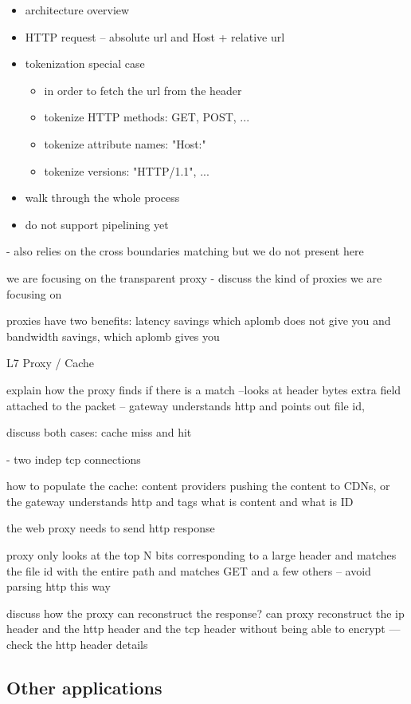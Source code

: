 \begin{itemize}
\item architecture overview
\item HTTP request -- absolute url and Host + relative url
\item tokenization special case \\
    \begin{itemize}
    \item in order to fetch the url from the header
    \item tokenize HTTP methods: GET, POST, ...
    \item tokenize attribute names: "Host:"
    \item tokenize versions: "HTTP/1.1", ...
    \end{itemize}
\item walk through the whole process
\item do not support pipelining yet
\end{itemize}

- also relies on the cross boundaries matching but we do not present here 

we are focusing on the transparent proxy
- discuss the kind of proxies we are focusing on

proxies have two benefits: latency savings which aplomb does not give you 
and bandwidth savings, which aplomb gives you
 
L7 Proxy / Cache

explain how the proxy finds if there is  a match --looks at header bytes
extra field attached to the packet -- gateway understands http and points out file id, 

discuss both cases: cache miss and hit

- two indep tcp connections 

how to populate the cache: content providers pushing the content to CDNs, or the gateway understands
http and tags what is content and what is ID

the web proxy needs to send http response 

proxy only looks at the top N bits corresponding to a large header and matches the file id with the entire path
and matches GET and a few others -- avoid parsing http this way


discuss how the proxy can reconstruct the response?
can proxy reconstruct the ip header and the http header  and the tcp header without being able to encrypt
--- check the http header details


\subsection{Other applications}\label{sec:vpn} \label{sec:other} \label{sec:not_supp}

